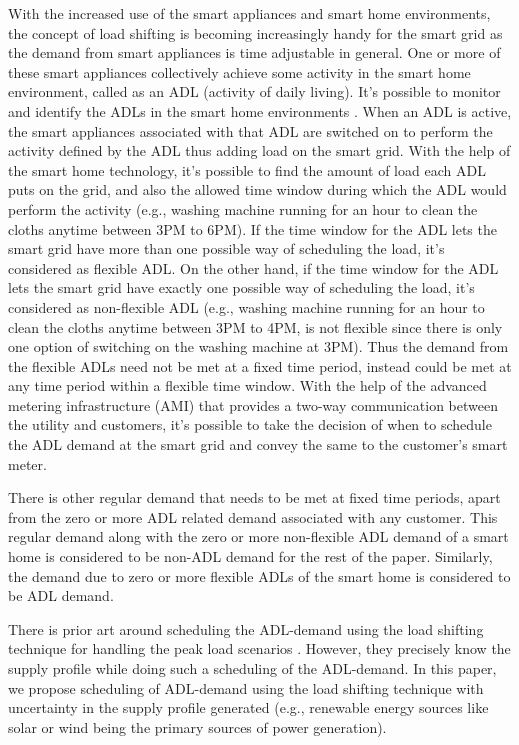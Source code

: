With the increased use of the smart appliances and smart home environments, the concept of load shifting is becoming increasingly handy for the smart grid as the demand from smart appliances is time adjustable in general. One or more of these smart appliances collectively achieve some activity in the smart home environment, called as an ADL (activity of daily living). It's possible to monitor and identify the ADLs in the smart home environments \cite{I2014, GPG2016}. When an ADL is active, the smart appliances associated with that ADL are switched on to perform the activity defined by the ADL thus adding load on the smart grid. With the help of the smart home technology, it's possible to find the amount of load each ADL puts on the grid, and also the allowed time window during which the ADL would perform the activity (e.g., washing machine running for an hour to clean the cloths anytime between 3PM to 6PM). If the time window for the ADL lets the smart grid have more than one possible way of scheduling the load, it's considered as flexible ADL. On the other hand, if the time window for the ADL lets the smart grid have exactly one possible way of scheduling the load, it's considered as non-flexible ADL (e.g., washing machine running for an hour to clean the cloths anytime between 3PM to 4PM, is not flexible since there is only one option of switching on the washing machine at 3PM). Thus the demand from the flexible ADLs need not be met at a fixed time period, instead could be met at any time period within a flexible time window. With the help of the advanced metering infrastructure (AMI) \cite{RAFK2014} that provides a two-way communication between the utility and customers, it's possible to take the decision of when to schedule the ADL demand at the smart grid and convey the same to the customer's smart meter.    

There is other regular demand that needs to be met at fixed time periods, apart from the zero or more ADL related demand associated with any customer. This regular demand along with the zero or more non-flexible ADL demand of a smart home is considered to be non-ADL demand for the rest of the paper. Similarly, the demand due to zero or more flexible ADLs of the smart home is considered to be ADL demand.
 
There is prior art around scheduling the ADL-demand using the load shifting technique for handling the peak load scenarios \cite{CL2014}. However, they precisely know the supply profile while doing such a scheduling of the ADL-demand. In this paper, we propose scheduling of ADL-demand using the load shifting technique with uncertainty in the supply profile generated (e.g., renewable energy sources like solar or wind being the primary sources of power generation).

